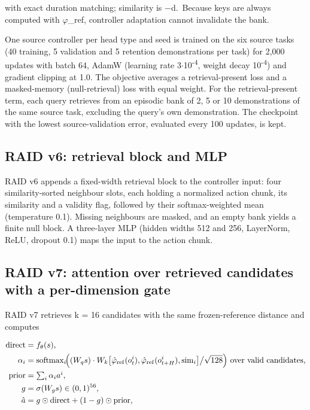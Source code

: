 \documentclass[11pt,a4paper]{article}
\begin{document}
with exact duration matching; similarity is \ensuremath{-}d.~Because keys are always computed with \ensuremath{\varphi}\_ref, controller adaptation cannot invalidate the bank.

One source controller per head type and seed is trained on the six source tasks (40 training, 5 validation and 5 retention demonstrations per task) for 2,000 updates with batch 64, AdamW (learning rate 3\ensuremath{\cdot}10\textsuperscript{-4}, weight decay 10\textsuperscript{-4}) and gradient clipping at 1.0. The objective averages a retrieval-present loss and a masked-memory (null-retrieval) loss with equal weight. For the retrieval-present term, each query retrieves from an episodic bank of 2, 5 or 10 demonstrations of the same source task, excluding the query's own demonstration. The checkpoint with the lowest source-validation error, evaluated every 100 updates, is kept.

\subsection{RAID v6: retrieval block and MLP}

RAID v6 appends a fixed-width retrieval block to the controller input: four similarity-sorted neighbour slots, each holding a normalized action chunk, its similarity and a validity flag, followed by their softmax-weighted mean (temperature 0.1). Missing neighbours are masked, and an empty bank yields a finite null block. A three-layer MLP (hidden widths 512 and 256, LayerNorm, ReLU, dropout 0.1) maps the input to the action chunk.

\subsection{RAID v7: attention over retrieved candidates with a per-dimension gate}

RAID v7 retrieves k = 16 candidates with the same frozen-reference distance and computes

\begin{align*}
\mathrm{direct} &= f_\theta(s),\\
\alpha_i &= \operatorname{softmax}_i\!\Bigl((W_q s)\cdot W_k\bigl[\hat\varphi_{\mathrm{ref}}(o^i_t),\hat\varphi_{\mathrm{ref}}(o^i_{t+H}),\mathrm{sim}_i\bigr]\big/\sqrt{128}\Bigr)\ \text{over valid candidates},\\
\mathrm{prior} &= \textstyle\sum_i \alpha_i a^i,\\
g &= \sigma(W_g s)\in(0,1)^{56},\\
\hat a &= g\odot\mathrm{direct} + (1-g)\odot\mathrm{prior},
\end{align*}
\end{document}
